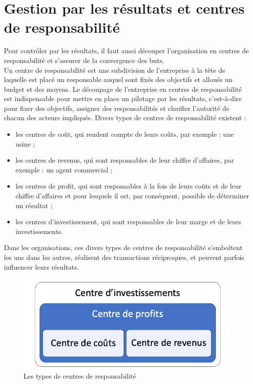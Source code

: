 \documentclass{kaobook}
\begin{document}
\section{Gestion par les résultats et centres de responsabilité}
\label{sec:org8dcb6c5}
Pour contrôler par les résultats, il faut aussi découper l’organisation en centres de responsabilité et s’assurer de la convergence des buts.\\
Un centre de responsabilité est une subdivision de l’entreprise à la tête de laquelle est placé un responsable auquel sont fixés des objectifs et alloués un budget et des moyens. Le découpage de l’entreprise en centres de responsabilité est indispensable pour mettre en place un pilotage par les résultats, c’est-à-dire pour fixer des objectifs, assigner des responsabilités et clarifier l’autorité de chacun des acteurs impliqués. Divers types de centres de responsabilité existent :\\
\begin{itemize}
\item les centres de coût, qui rendent compte de leurs coûts, par exemple : une usine ;\\
\item les centres de revenus, qui sont responsables de leur chiffre d’affaires, par exemple : un agent commercial ;\\
\item les centres de profit, qui sont responsables à la fois de leurs coûts et de leur chiffre d’affaires et pour lesquels il est, par conséquent, possible de déterminer un résultat ;\\
\item les centres d’investissement, qui sont responsables de leur marge et de leurs investissements.\\
\end{itemize}
Dans les organisations, ces divers types de centres de responsabilité s’emboîtent les uns dans les autres, réalisent des transactions réciproques, et peuvent parfois influencer leurs résultats.\\
\begin{figure}[htbp]
\centering
\includegraphics[width=.9\linewidth]{./img/centres.jpeg}
\caption{Les types de centres de responsabilité}
\end{figure}
\end{document}
